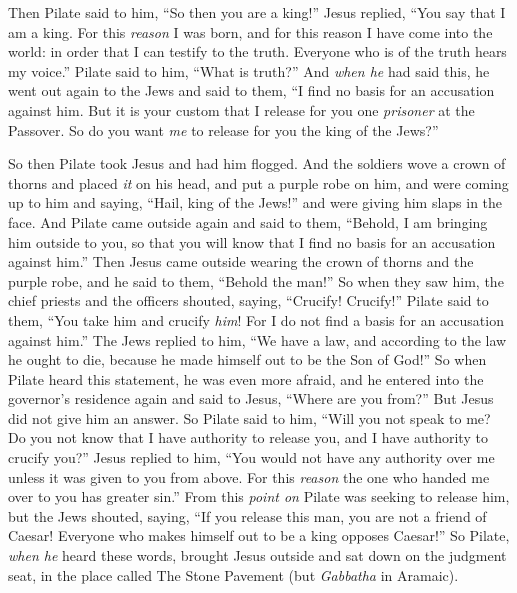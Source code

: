 \begin{biblechapter}
\verse Then Pilate said to him, “So then you are a king!” Jesus replied, “You say that I am a king. For this \textit{reason} I was born, and for this reason I have come into the world: in order that I can testify to the truth. Everyone who is of the truth hears my voice.”
\verse Pilate said to him, “What is truth?”
\verse And \textit{when he} had said this, he went out again to the Jews and said to them, “I find no basis for an accusation against him.
\verse But it is your custom that I release for you one \textit{prisoner} at the Passover. So do you want \textit{me} to release for you the king of the Jews?”
\end{biblechapter}

\begin{biblechapter} %
 So then Pilate took Jesus and had him flogged.
\verse And the soldiers wove a crown of thorns and placed \textit{it} on his head, and put a purple robe on him,
\verse and were coming up to him and saying, “Hail, king of the Jews!” and were giving him slaps in the face.
\verse And Pilate came outside again and said to them, “Behold, I am bringing him outside to you, so that you will know that I find no basis for an accusation against him.”
\verse Then Jesus came outside wearing the crown of thorns and the purple robe, and he said to them, “Behold the man!”
\verse So when they saw him, the chief priests and the officers shouted, saying, “Crucify! Crucify!” Pilate said to them, “You take him and crucify \textit{him}! For I do not find a basis for an accusation against him.”
\verse The Jews replied to him, “We have a law, and according to the law he ought to die, because he made himself out to be the Son of God!”
\verse So when Pilate heard this statement, he was even more afraid,
\verse and he entered into the governor’s residence again and said to Jesus, “Where are you from?” But Jesus did not give him an answer.
\verse So Pilate said to him, “Will you not speak to me? Do you not know that I have authority to release you, and I have authority to crucify you?”
\verse Jesus replied to him, “You would not have any authority over me unless it was given to you from above. For this \textit{reason} the one who handed me over to you has greater sin.”
\verse From this \textit{point on} Pilate was seeking to release him, but the Jews shouted, saying, “If you release this man, you are not a friend of Caesar! Everyone who makes himself out to be a king opposes Caesar!”
\verse So Pilate, \textit{when he} heard these words, brought Jesus outside and sat down on the judgment seat, in the place called The Stone Pavement (but \textit{Gabbatha} in Aramaic).

\end{biblechapter}
